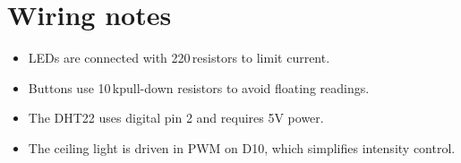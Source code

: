 \section{Wiring notes}
\begin{itemize}
  \item LEDs are connected with 220\,\textohm resistors to limit current.
  \item Buttons use 10\,k\textohm pull-down resistors to avoid floating readings.
  \item The DHT22 uses digital pin 2 and requires 5V power.
  \item The ceiling light is driven in PWM on D10, which simplifies intensity control.
\end{itemize}
